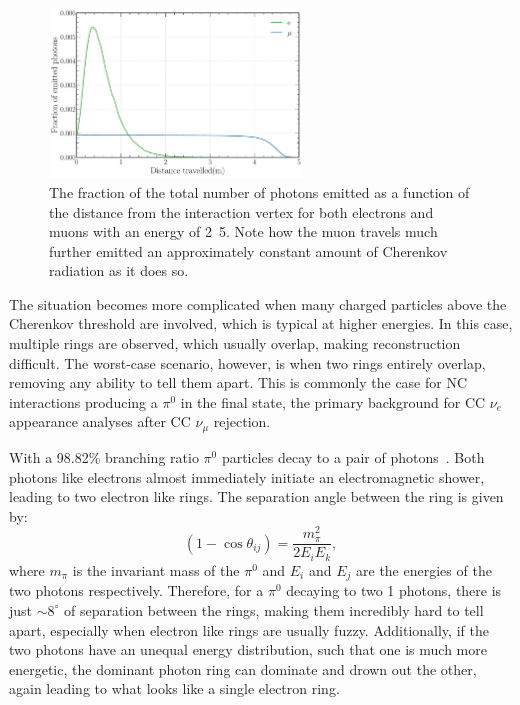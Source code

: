 \begin{figure} %
    \includegraphics[width=0.6\textwidth]{diagrams/4-chips/emission_distance.pdf}
    \caption[Fraction of Cherenkov photons emitted as a function of distance.]
    {The fraction of the total number of photons emitted as a function of the distance from the
        interaction vertex for both electrons and muons with an energy of \unit{2.5}{\GeV}. Note
        how the muon travels much further emitted an approximately constant amount of Cherenkov
        radiation as it does so.}
    \label{fig:emission distance}
\end{figure}

The situation becomes more complicated when many charged particles above the Cherenkov threshold
are involved, which is typical at higher energies. In this case, multiple rings are observed,
which usually overlap, making reconstruction difficult. The worst-case scenario, however, is when
two rings entirely overlap, removing any ability to tell them apart. This is commonly the case for
NC interactions producing a $\pi^{0}$ in the final state, the primary background for CC $\nu_{e}$
appearance analyses after CC $\nu_{\mu}$ rejection.

With a 98.82\% branching ratio $\pi^{0}$ particles decay to a pair of photons~\cite{particle2020}.
Both photons like electrons almost immediately initiate an electromagnetic shower, leading to two
electron like rings. The separation angle between the ring is given by:
\begin{equation}
    (1-\cos\theta_{ij})=\frac{m_{\pi}^2}{2E_{i}E_{k}},
\end{equation}
where $m_{\pi}$ is the invariant mass of the $\pi^{0}$ and $E_{i}$ and $E_{j}$ are the energies of
the two photons respectively. Therefore, for a $\pi^{0}$ decaying to two \unit{1}{\GeV} photons,
there is just $\sim 8^{\circ}$ of separation between the rings, making them incredibly hard to
tell apart, especially when electron like rings are usually fuzzy. Additionally, if the two
photons have an unequal energy distribution, such that one is much more energetic, the dominant
photon ring can dominate and drown out the other, again leading to what looks like a single
electron ring.

